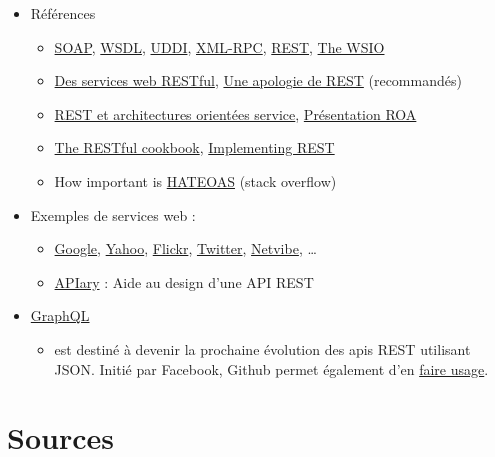 \begin{itemize}
\tightlist
\item
  Références

  \begin{itemize}
  \tightlist
  \item
    \href{https://www.w3.org/TR/soap/}{SOAP},
    \href{https://www.w3.org/2002/ws/desc/}{WSDL},
    \href{http://uddi.xml.org/}{UDDI},
    \href{http://xmlrpc.scripting.com/default.html}{XML-RPC},
    \href{http://www.ics.uci.edu/~fielding/pubs/dissertation/top.htm}{REST},
    \href{http://www.oasis-ws-i.org/}{The WSIO}
  \item
    \href{https://larlet.fr/david/biologeek/archives/20070629-architecture-orientee-ressource-pour-faire-des-services-web-restful/}{Des
    services web RESTful},
    \href{https://web.archive.org/web/20160310205502/http://home.ccil.org/~cowan/restws.pdf}{Une
    apologie de REST} (recommandés)
  \item
    \href{http://www.figer.com/Publications/SOA.htm}{REST et
    architectures orientées service},
    \href{http://fr.slideshare.net/samijaber/symposium-dng-2008-roa}{Présentation
    ROA}
  \item
    \href{http://restcookbook.com/}{The RESTful cookbook},
    \href{https://code.google.com/archive/p/implementing-rest/wikis}{Implementing
    REST}
  \item
    How important is
    \href{http://stackoverflow.com/questions/20335967/how-useful-important-is-rest-hateoas-maturity-level-3}{HATEOAS}
    (stack overflow)
  \end{itemize}
\item
  Exemples de services web :

  \begin{itemize}
  \tightlist
  \item
    \href{https://developers.google.com/products/}{Google},
    \href{https://developer.yahoo.com/everything.html}{Yahoo},
    \href{https://www.flickr.com/services/api/}{Flickr},
    \href{https://dev.twitter.com/overview/api}{Twitter},
    \href{http://uwa.netvibes.com/docs/Uwa/html/index.html}{Netvibe},
    \ldots{}
  \item
    \href{https://apiary.io/}{APIary} : Aide au design d'une API REST
  \end{itemize}
\item
  \href{http://graphql.org/}{GraphQL}

  \begin{itemize}
  \tightlist
  \item
    est destiné à devenir la prochaine évolution des apis REST utilisant
    JSON. Initié par Facebook, Github permet également d'en
    \href{https://developer.github.com/v4/}{faire usage}.
  \end{itemize}
\end{itemize}

\hypertarget{sources}{%
\section{Sources}\label{sources}}
